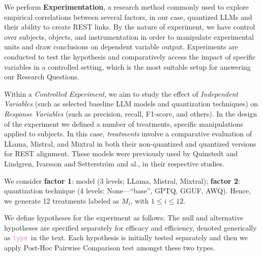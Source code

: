 \documentclass[conference]{IEEEtran}
\begin{document}
We perform \textbf{Experimentation}\cite{wohlin2012experimentation}, a research method commonly used
to explore empirical correlations between several factors, in our case,
quantized LLMs and their ability to create REST links. By the nature of
experiment, we have control over subjects, objects, and instrumentation in order
to manipulate experimental units and draw conclusions on dependent variable
output. Experiments are conducted to test the hypothesis and comparatively
access the impact of specific variables in a controlled setting, which is the
most suitable setup for answering our Research Questions.

Within a \textit{Controlled Experiment}, we aim to study the effect of
\textit{Independent Variables} (such as selected baseline LLM models and
quantization techniques) on \textit{Response Variables} (such as precision,
recall, F1-score, and others)\cite{wohlin2012experimentation}. In the design of
the experiment we defined a number of treatments, specific manipulations applied
to subjects\cite{wohlin2012experimentation}.  In this case, \textit{treatments}
involve a comparative evaluation of LLama, Mistral, and Mixtral in both their
non-quantized and quantized versions for REST alignment. These models were
previously used by Quinstedt and Lindgren, Ivarsson and Setterström and
al.\cite{quinstedt2024Optimizing},\cite{ivarsson2023automated} in their
respective studies. 



We consider \textbf{factor 1}: model (3 levels; LLama, Mistral, Mixtral);
\textbf{factor 2}: quantization technique (4 levels: None---``base'', GPTQ,
GGUF, AWQ). Hence, we generate 12 treatments labeled as $M_{i}$, with $1 \leq i
\leq 12$.

\newcommand{\violetType}{\texttt{\textcolor{violet}{type}}}

We define hypotheses for the experiment as follows: The null and alternative
hypotheses are specified separately for efficacy and efficiency, denoted
generically as \violetType\ in the text. Each hypothesis is initially tested
separately and then we apply Post-Hoc Pairwise Comparison test amongst these two
types.
\end{document}
